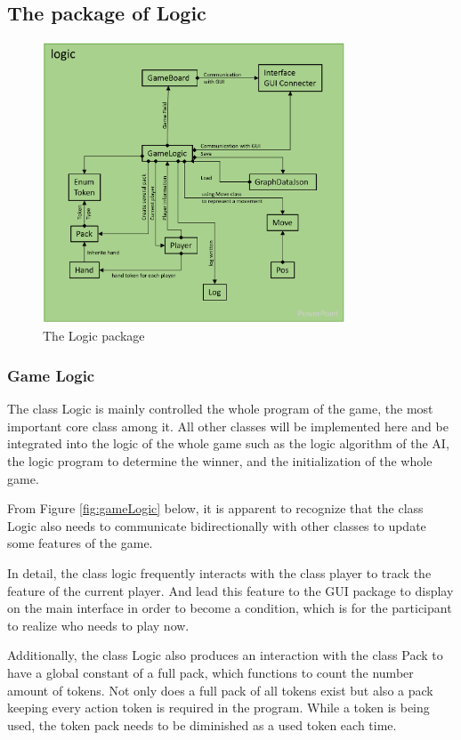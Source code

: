 \subsection{The package of Logic}

\begin{figure}[h]
	\centering
	\includegraphics[width=0.8\textwidth]{image/diagram_3}
	\caption{The Logic package}
	\label{fig:logicPackage}
\end{figure}
\subsubsection{Game Logic}


The class Logic is mainly controlled the whole program of the game, the most important core class among it. All other classes will be implemented here and be integrated into the logic of the whole game such as the logic algorithm of the AI, the logic program to determine the winner, and the initialization of the whole game. 

From Figure \ref{fig:gameLogic} below, it is apparent to recognize that the class Logic also needs to communicate bidirectionally with other classes to update some features of the game.

In detail, the class logic frequently interacts with the class player to track the feature of the current player. And lead this feature to the GUI package to display on the main interface in order to become a condition, which is for the participant to realize who needs to play now.   

Additionally, the class Logic also produces an interaction with the class Pack to have a global constant of a full pack, which functions to count the number amount of tokens. Not only does a full pack of all tokens exist but also a pack keeping every action token is required in the program. 
While a token is being used, the token pack needs to be diminished as a used token each time.


